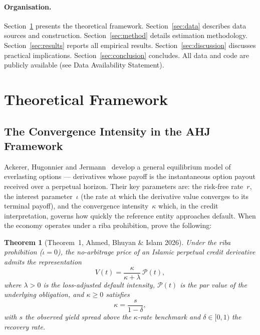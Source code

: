 \documentclass[12pt]{article}
\theoremstyle{plain}
\newtheorem{theorem}{Theorem}[section]
\theoremstyle{definition}
\theoremstyle{remark}
\begin{document}
\paragraph{Organisation.}
Section~\ref{sec:theory} presents the theoretical framework.
Section~\ref{sec:data} describes data sources and construction.
Section~\ref{sec:method} details estimation methodology.
Section~\ref{sec:results} reports all empirical results.
Section~\ref{sec:discussion} discusses practical implications.
Section~\ref{sec:conclusion} concludes. All data and code are publicly
available (see Data Availability Statement).

\section{Theoretical Framework}
\label{sec:theory}

\subsection{The Convergence Intensity in the AHJ Framework}

Ackerer, Hugonnier and Jermann~\cite{Ackerer2024} develop a general equilibrium
model of everlasting options --- derivatives whose payoff is the instantaneous
option payout received over a perpetual horizon. Their key parameters are:
the risk-free rate~$r$, the interest parameter~$\iota$ (the rate at which the
derivative value converges to its terminal payoff), and the convergence
intensity~$\kappa$ which, in the credit interpretation, governs how quickly the
reference entity approaches default. When the economy operates under a riba
prohibition, \citet{AhmedBhuyanIslam2026} prove the following:

\begin{theorem}[Theorem~1, Ahmed, Bhuyan \& Islam 2026]
\label{thm:main}
Under the riba prohibition ($\iota = 0$), the no-arbitrage price of an Islamic
perpetual credit derivative admits the representation
\begin{equation}
  V(t) = \frac{\kappa}{\kappa + \lambda}\, \mathcal{P}(t),
  \label{eq:ahj_price}
\end{equation}
where $\lambda > 0$ is the loss-adjusted default intensity, $\mathcal{P}(t)$
is the par value of the underlying obligation, and $\kappa \geq 0$ satisfies
\begin{equation}
  \kappa = \frac{s}{1 - \delta},
  \label{eq:identification}
\end{equation}
with $s$ the observed yield spread above the $\kappa$-rate benchmark and
$\delta \in [0,1)$ the recovery rate.
\end{theorem}
\end{document}
